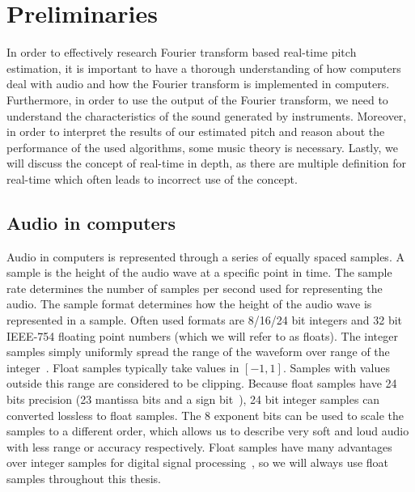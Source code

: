 \documentclass[a4paper,10pt,twocolumn]{article}
\begin{document}
\section{Preliminaries}
In order to effectively research Fourier transform based real-time pitch estimation, it is important to have a thorough understanding of how computers deal with audio and how the Fourier transform is implemented in computers. Furthermore, in order to use the output of the Fourier transform, we need to understand the characteristics of the sound generated by instruments. Moreover, in order to interpret the results of our estimated pitch and reason about the performance of the used algorithms, some music theory is necessary. Lastly, we will discuss the concept of real-time in depth, as there are multiple definition for real-time which often leads to incorrect use of the concept.


\subsection{Audio in computers}  \label{sub:computer_audio}
Audio in computers is represented through a series of equally spaced samples. A sample is the height of the audio wave at a specific point in time. The sample rate determines the number of samples per second used for representing the audio. The sample format determines how the height of the audio wave is represented in a sample. Often used formats are 8/16/24 bit integers and 32 bit IEEE-754 floating point numbers (which we will refer to as floats). The integer samples simply uniformly spread the range of the waveform over range of the integer~\cite{dspfloat}. Float samples typically take values in $[-1, 1]$. Samples with values outside this range are considered to be clipping. Because float samples have 24 bits precision (23 mantissa bits and a sign bit~\cite{ieeefloat}), 24 bit integer samples can converted lossless to float samples. The 8 exponent bits can be used to scale the samples to a different order, which allows us to describe very soft and loud audio with less range or accuracy respectively. Float samples have many advantages over integer samples for digital signal processing~\cite{dspfloat}, so we will always use float samples throughout this thesis.
\end{document}
